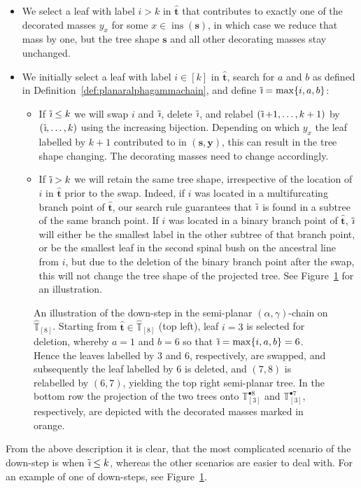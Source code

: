 \documentclass[a4paper, final]{amsart}
\theoremstyle{plain}
\theoremstyle{definition}
\newcommand{\tree}[1][t]{\boldsymbol{#1}}
\newcommand{\that}[1][t]{\hat{\boldsymbol{#1}}} %
\newcommand{\Thatspace}[1][\T]{\widehat{\boldsymbol{#1}}} %
\newcommand{\T}{\mathbb{T}}
\DeclareMathOperator{\insertable}{ins}
\newcommand{\insertablef}[1][\tree]{\insertable({\tree[#1]})}
\DeclareMathOperator{\tildei}{\tilde{\textit{\i}}}
\begin{document}
\begin{itemize}
  \item We select a leaf with label $i > k$ in $\that$ that contributes to exactly one of the decorated masses $y_x$ for some $x \in \insertablef[s]$, in which case we reduce that mass by one, but the tree shape $\tree[s]$ and all other decorating masses stay unchanged.
  \item We initially select a leaf with label $i \in [k]$ in $\that$, search for $a$ and $b$ as defined in Definition~\ref{def:planaralphagammachain}, and define $\tildei = \max\{i, a, b\}$:
    \begin{itemize}
      \item If $\tildei \leq k$ we will swap $i$ and $\tildei$, delete $\tildei$, and relabel $(\tildei+1, \ldots, k+1)$ by $(\tildei, \ldots, k)$ using the increasing bijection.
        Depending on which $y_x$ the leaf labelled by $k+1$ contributed to in $(\tree[s], \mathbf{y})$, this can result in the tree shape changing.
        The decorating masses need to change accordingly.
      \item If $\tildei > k$ we will retain the same tree shape, irrespective of the location of $i$ in $\that$ prior to the swap.
        Indeed, if $i$ was located in a  multifurcating branch point of $\that$, our search rule guarantees that $\tildei$ is found in a subtree of the same branch point.
        If $i$ was located in a binary branch point of $\that$, $\tildei$ will either be the smallest label in the other subtree of that branch point, or be the smallest leaf in the second spinal bush on the ancestral line from $i$, but due to the deletion of the binary branch point after the swap, this will not change the tree shape of the projected tree.
        See Figure~\ref{fig:decoratedtrees_downstep} for an illustration. 
    \end{itemize}
\end{itemize}
%
\begin{figure}[t]
  \centering
  
  \caption{An illustration of the down-step in the semi-planar $(\alpha, \gamma)$-chain on $\Thatspace_{[8]}$.
    Starting from $\that \in \Thatspace_{[8]}$ (top left), leaf $i = 3$ is selected for deletion, whereby $a = 1$ and $b = 6$ so that $\tildei = \max \{i, a, b \} = 6$.
Hence the leaves labelled by $3$ and $6$, respectively, are swapped, and subsequently the leaf labelled by $6$ is deleted, and $(7, 8)$ is relabelled by $(6, 7)$, yielding the top right semi-planar tree.
In the bottom row the projection of the two trees onto $\T_{[3]}^{\bullet 8}$ and $\T_{[3]}^{\bullet 7}$, respectively, are depicted with the decorated masses marked in orange.
}
  \label{fig:decoratedtrees_downstep}
\end{figure}
%
From the above description it is clear, that the most complicated scenario of the down-step is when $\tildei \leq k$, whereas the other scenarios are easier to deal with.
For an example of one of down-steps, see Figure~\ref{fig:decoratedtrees_downstep}.
\end{document}
